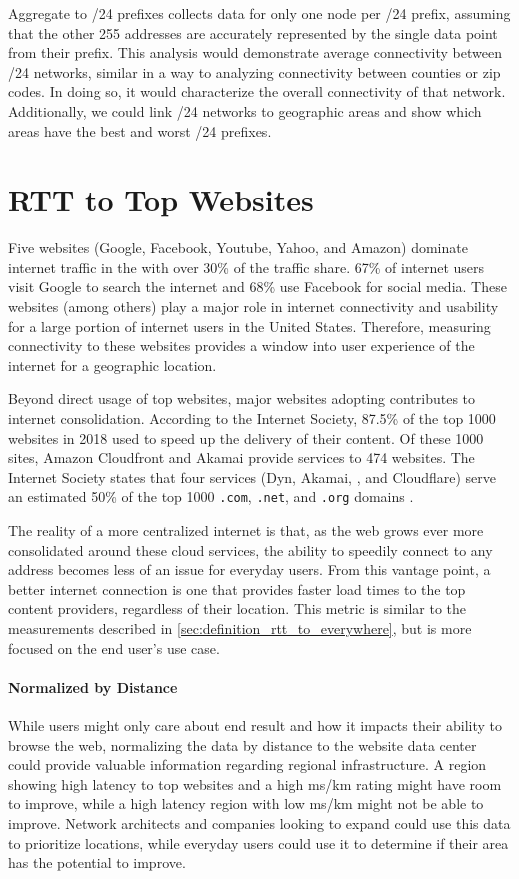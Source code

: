 Aggregate \rtt to /24 prefixes collects data for only one node per /24 prefix, assuming that the other 255 addresses are accurately represented by the single data point from their prefix. This analysis would demonstrate average connectivity between /24 networks, similar in a way to analyzing connectivity between counties or zip codes. In doing so, it would characterize the overall connectivity of that network. Additionally, we could link /24 networks to geographic areas and show which areas have the best and worst /24 prefixes.

\section{RTT to Top Websites}\label{sec:definition_rtt_site_ping}
Five websites (Google, Facebook, Youtube, Yahoo, and Amazon) dominate internet traffic in the \us with over 30\% of the traffic share. 67\% of \us internet users visit Google to search the internet and 68\% use Facebook for social media\cite{Tachalova2017}. These websites (among others) play a major role in internet connectivity and usability for a large portion of internet users in the United States. Therefore, measuring connectivity to these websites provides a window into user experience of the internet for a geographic location.

Beyond direct usage of top websites, major websites adopting \cdns contributes to internet consolidation. According to the Internet Society, 87.5\% of the top 1000 websites in 2018 used \cdns to speed up the delivery of their content. Of these 1000 sites, Amazon Cloudfront and Akamai provide \cdn services to 474 websites. The Internet Society states that four services (Dyn, Akamai, \AWS, and Cloudflare) serve an estimated 50\% of the top 1000 \texttt{.com}, \texttt{.net}, and \texttt{.org} domains \cite{TheInternetSociety2019}.

The reality of a more centralized internet is that, as the web grows ever more consolidated around these cloud services, the ability to speedily connect to any \ip address becomes less of an issue for everyday users. From this vantage point, a better internet connection is one that provides faster load times to the top content providers, regardless of their location. This metric is similar to the \rtt measurements described in \ref{sec:definition_rtt_to_everywhere}, but is more focused on the end user's use case.

\paragraph{Normalized by Distance}
While users might only care about end result and how it impacts their ability to browse the web, normalizing the data by distance to the website data center could provide valuable information regarding regional infrastructure. A region showing high latency to top websites and a high ms/km rating might have room to improve, while a high latency region with low ms/km might not be able to improve. Network architects and companies looking to expand could use this data to prioritize locations, while everyday users could use it to determine if their area has the potential to improve.

